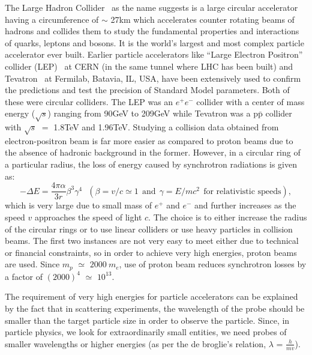 The Large Hadron Collider~\cite{Bruning:782076, Evans:2008zzb} as the name suggests is a large circular accelerator having a circumference of $\sim$ 27\unit{km}
which accelerates counter rotating beams of hadrons and collides them to study the fundamental properties and interactions of quarks, leptons and bosons.  
It is the world's largest and most complex particle accelerator ever built. Earlier particle accelerators like ``Large Electron Positron'' collider
(LEP)~\cite{LEP} at CERN (in the same tunnel where LHC has been built) and Tevatron~\cite{Holmes:2011ey} at Fermilab, Batavia, IL, USA,
have been extensively used to confirm the predictions and test the precision of Standard Model parameters. Both of these were circular colliders.
The LEP was an $e^{+}e^{-}$ collider with a center of mass energy ($\sqrt{s}$) ranging from 90\unit{GeV} to 209\unit{GeV}
while Tevatron was a $\textrm{p}\bar{\textrm{p}}$ collider with $\sqrt{s}$ $=$ 1.8\unit{TeV} and 1.96\unit{TeV}.   
Studying a collision data obtained from electron-positron beam is far more easier as compared to proton beams due to the absence of hadronic background in the former.
However, in a circular ring of a particular radius, the loss of energy caused by synchrotron radiations is given as:
\begin{equation}
  -\Delta{E} = \frac{4{\pi}{\alpha}}{3r}\beta^{3}\gamma^{4} \:\:\: (\beta = v/c \simeq 1 \:\: \textrm{and} \:\: \gamma = E/mc^{2} \:\: \textrm{for relativistic speeds}),
  \label{eq:synchro}
\end{equation}
which is very large due to small mass of $e^{+}$ and $e^{-}$ and further increases as the speed $v$ approaches the speed of light $c$.
The choice is to either increase the radius of the circular rings or to use linear colliders or use heavy
particles in collision beams. The first two instances are not very easy to meet either due to technical or financial constraints,
so in order to achieve very high energies, proton beams are used. Since $m_{p}$ $\simeq$ $2000\:m_{e}$, use of proton beam reduces
synchrotron losses by a factor of ${(2000)}^{4}$ $\simeq$ $10^{13}$.

The requirement of very high energies for particle accelerators can be explained by the fact that in scattering experiments, the wavelength
of the probe should be smaller than the target particle size in order to observe the particle. Since, in particle physics, we look for extraordinarily small
entities, we need probes of smaller wavelengths or higher energies (as per the de broglie's relation, $\lambda$ = $\frac{h}{mv}$).

